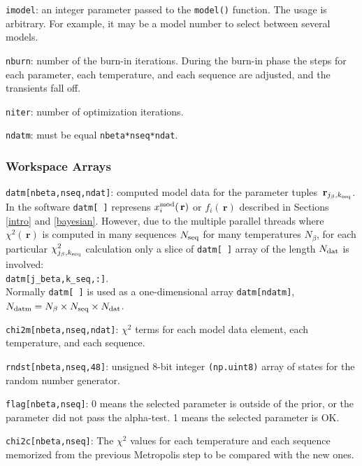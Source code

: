 \documentclass[preprint2]{aastex}
\newcommand{\bfr}{\,\mathbf{r}}
\begin{document}
\verb|imodel|: an integer parameter passed to the \verb|model()| function. The usage is
        arbitrary. For example, it may be a model number to select between
        several models.

\verb|nburn|: number of the burn-in iterations. During the burn-in phase the steps
       for each parameter, each temperature, and each sequence are adjusted,
       and the transients fall off.

\verb|niter|: number of optimization iterations.

\verb|ndatm|: must be equal \verb|nbeta*nseq*ndat|.



\subsubsection{Workspace Arrays}

\verb|datm[nbeta,nseq,ndat]|: computed model data for the parameter tuples 
							  $\bfr_{j_\beta, k_{\rm seq}}$. 
							  In the software \verb|datm[ ]|
							  represens $x^{\rm mod}_i(\bfr)$ or $f_i(\bfr)$ described
							  in Sections \ref{intro} and \ref{bayesian}. However,
							  due to the multiple parallel threads where $\chi^2(\bfr)$
							  is computed  in many sequences $N_{\rm seq}$ for many 
							  temperatures $N_\beta$, for each particular 
							  $\chi^2_{j_\beta, k_{\rm seq}}$ calculation only a slice 
							  of \verb|datm[ ]| array of the length $N_{\rm dat}$ is
							  involved: \\
							  \verb|datm[j_beta,k_seq,:]|. \\
							  Normally \verb|datm[ ]| is used as a one-dimensional
							  array \verb|datm[ndatm]|, 
							  $N_{\rm datm} = N_\beta \times N_{\rm seq} \times N_{\rm dat}$.

\verb|chi2m[nbeta,nseq,ndat]|: $\chi^2$ terms for each model data element, each
                        temperature, and each sequence.

\verb|rndst[nbeta,nseq,48]|: unsigned 8-bit integer \verb|(np.uint8)| array of states
                      for the random number generator.

\verb|flag[nbeta,nseq]|: 0 means the selected parameter is outside of the prior,
                  or the parameter did not pass the alpha-test.
                  1 means the selected parameter is OK.
                  
\verb|chi2c[nbeta,nseq]|: The $\chi^2$ values for each temperature and each sequence 
                          memorized from the previous Metropolis step to be compared
                          with the new ones.
\end{document}
